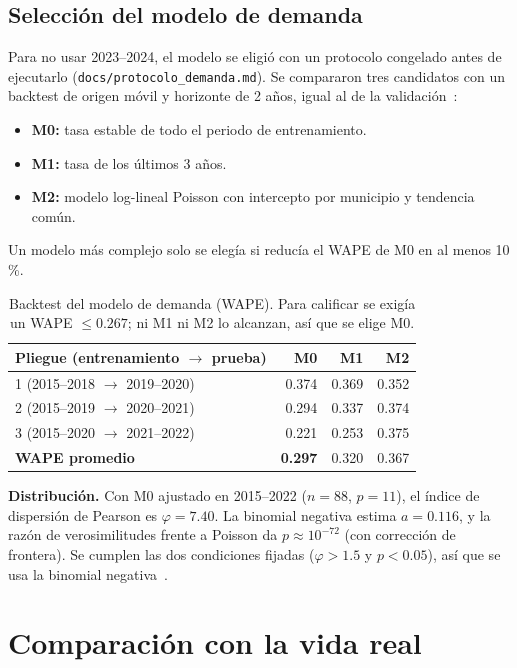 \documentclass[11pt,letterpaper]{article}
\newcommand{\cod}[1]{\texttt{#1}}
\begin{document}
\subsection{Selección del modelo de demanda}

Para no usar 2023--2024, el modelo se eligió con un protocolo congelado antes de ejecutarlo (\cod{docs/protocolo\_demanda.md}). Se compararon tres candidatos con un backtest de origen móvil y horizonte de 2 años, igual al de la validación~\cite{hyndman}:
\begin{itemize}[nosep]
  \item \textbf{M0:} tasa estable de todo el periodo de entrenamiento.
  \item \textbf{M1:} tasa de los últimos 3 años.
  \item \textbf{M2:} modelo log-lineal Poisson con intercepto por municipio y tendencia común.
\end{itemize}
Un modelo más complejo solo se elegía si reducía el WAPE de M0 en al menos 10\,\%.

\begin{table}[htbp]
\centering
\small
\begin{tabular}{lrrr}
\toprule
Pliegue (entrenamiento $\to$ prueba) & M0 & M1 & M2 \\
\midrule
1 (2015--2018 $\to$ 2019--2020) & 0.374 & 0.369 & 0.352 \\
2 (2015--2019 $\to$ 2020--2021) & 0.294 & 0.337 & 0.374 \\
3 (2015--2020 $\to$ 2021--2022) & 0.221 & 0.253 & 0.375 \\
\midrule
\textbf{WAPE promedio} & \textbf{0.297} & 0.320 & 0.367 \\
\bottomrule
\end{tabular}
\caption{Backtest del modelo de demanda (WAPE). Para calificar se exigía un WAPE $\le 0.267$; ni M1 ni M2 lo alcanzan, así que se elige M0.}
\label{tab:backtest}
\end{table}

\textbf{Distribución.} Con M0 ajustado en 2015--2022 ($n=88$, $p=11$), el índice de dispersión de Pearson es $\varphi=7.40$. La binomial negativa estima $a=0.116$, y la razón de verosimilitudes frente a Poisson da $p\approx10^{-72}$ (con corrección de frontera). Se cumplen las dos condiciones fijadas ($\varphi>1.5$ y $p<0.05$), así que se usa la binomial negativa~\cite{cameron}.

\section{Comparación con la vida real}
\label{sec:real}
\end{document}
